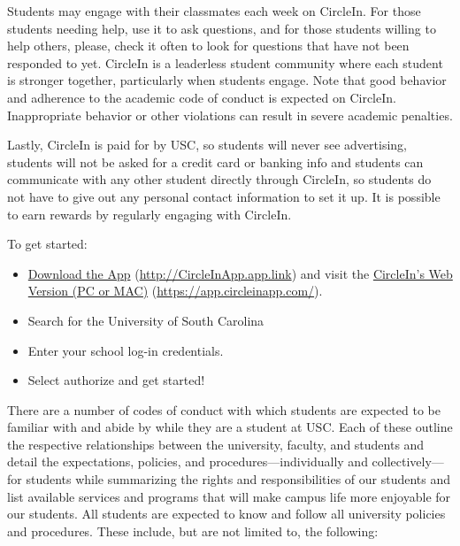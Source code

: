 \documentclass[11pt,letterpaper]{article}
\begin{document}
Students may engage with their classmates each week on CircleIn. For those students needing help, use it to ask questions, and for those students willing to help others, please, check it often to look for questions that have not been responded to yet. CircleIn is a leaderless student community where each student is stronger together, particularly when students engage. Note that good behavior and adherence to the academic code of conduct is expected on CircleIn. Inappropriate behavior or other violations can result in severe academic penalties. \par\vspace{0.3cm}

Lastly, CircleIn is paid for by USC, so students will never see advertising, students will not be asked for a credit card or banking info and students can communicate with any other student directly through CircleIn, so students do not have to give out any personal contact information to set it up. It is possible to earn rewards by regularly engaging with CircleIn. \par\vspace{0.3cm}

To get started:
	\begin{itemize}
	\item \href{http://CircleInApp.app.link}{Download the App} (\url{http://CircleInApp.app.link}) and visit the \href{https://app.circleinapp.com/}{CircleIn's Web Version (PC or MAC)} (\url{https://app.circleinapp.com/}).
	\item Search for the University of South Carolina
	\item Enter your school log-in credentials. 
	\item Select authorize and get started! 
	\end{itemize}
\pspace




There are a number of codes of conduct with which students are expected to be familiar with and abide by while they are a student at USC. Each of these outline the respective relationships between the university, faculty, and students and detail the expectations, policies, and procedures---individually and collectively---for students while summarizing the rights and responsibilities of our students and list available services and programs that will make campus life more enjoyable for our students. All students are expected to know and follow all university policies and procedures. These include, but are not limited to, the following: \pspace
\end{document}
